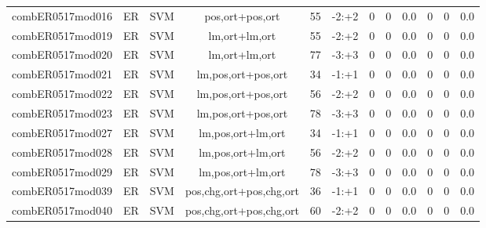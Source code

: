 \documentclass[a4paper]{article}
\begin{document}
\begin{landscape}
\begin{center}
\begin{tabular}{ |c|c|c|c|c|c|c|c|c|c|c|c|}
 
 	
 	\small{ combER0517mod016 } & ER & SVM & pos,ort+pos,ort  &  55 &  -2:+2  &  0 & 0 & 0.0  &  0 & 0 & 0.0 \\
 	

 
 	
 	\small{ combER0517mod019 } & ER & SVM & lm,ort+lm,ort  &  55 &  -2:+2  &  0 & 0 & 0.0  &  0 & 0 & 0.0 \\
 	

 
 	
 	\small{ combER0517mod020 } & ER & SVM & lm,ort+lm,ort  &  77 &  -3:+3  &  0 & 0 & 0.0  &  0 & 0 & 0.0 \\
 	

 
 	
 	\small{ combER0517mod021 } & ER & SVM & lm,pos,ort+pos,ort  &  34 &  -1:+1  &  0 & 0 & 0.0  &  0 & 0 & 0.0 \\
 	

 
 	
 	\small{ combER0517mod022 } & ER & SVM & lm,pos,ort+pos,ort  &  56 &  -2:+2  &  0 & 0 & 0.0  &  0 & 0 & 0.0 \\
 	

 
 	
 	\small{ combER0517mod023 } & ER & SVM & lm,pos,ort+pos,ort  &  78 &  -3:+3  &  0 & 0 & 0.0  &  0 & 0 & 0.0 \\
 	

 
 	
 	\small{ combER0517mod027 } & ER & SVM & lm,pos,ort+lm,ort  &  34 &  -1:+1  &  0 & 0 & 0.0  &  0 & 0 & 0.0 \\
 	

 
 	
 	\small{ combER0517mod028 } & ER & SVM & lm,pos,ort+lm,ort  &  56 &  -2:+2  &  0 & 0 & 0.0  &  0 & 0 & 0.0 \\
 	

 
 	
 	\small{ combER0517mod029 } & ER & SVM & lm,pos,ort+lm,ort  &  78 &  -3:+3  &  0 & 0 & 0.0  &  0 & 0 & 0.0 \\
 	

 
 	
 	\small{ combER0517mod039 } & ER & SVM & pos,chg,ort+pos,chg,ort  &  36 &  -1:+1  &  0 & 0 & 0.0  &  0 & 0 & 0.0 \\
 	

 
 	
 	\small{ combER0517mod040 } & ER & SVM & pos,chg,ort+pos,chg,ort  &  60 &  -2:+2  &  0 & 0 & 0.0  &  0 & 0 & 0.0 \\
 	


\end{tabular}
\end{center}
\end{landscape}
\end{document}
